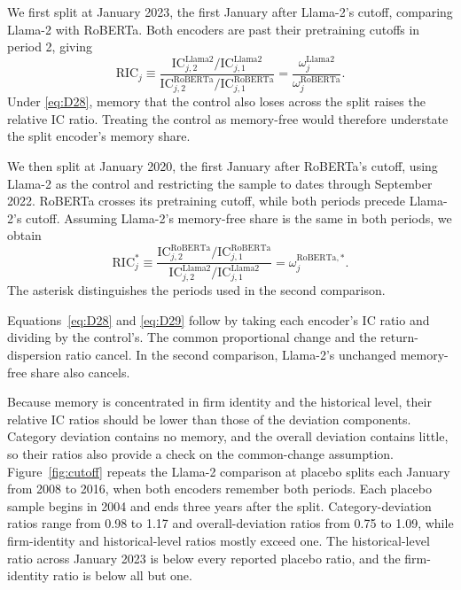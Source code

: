 \documentclass[11pt,letterpaper]{article}
\theoremstyle{remark}
\begin{document}
We first split at January 2023, the first January after Llama-2's cutoff, comparing Llama-2 with RoBERTa. Both encoders are past their pretraining cutoffs in period 2, giving
\begin{equation}\label{eq:D28}
\mathrm{RIC}_j
\equiv
\frac{\mathrm{IC}_{j,2}^{\mathrm{Llama2}}/\mathrm{IC}_{j,1}^{\mathrm{Llama2}}}
{\mathrm{IC}_{j,2}^{\mathrm{RoBERTa}}/\mathrm{IC}_{j,1}^{\mathrm{RoBERTa}}}
=
\frac{\omega_j^{\mathrm{Llama2}}}{\omega_j^{\mathrm{RoBERTa}}}.
\end{equation}
Under \eqref{eq:D28}, memory that the control also loses across the split raises the relative IC ratio. Treating the control as memory-free would therefore understate the split encoder's memory share.

We then split at January 2020, the first January after RoBERTa's cutoff, using Llama-2 as the control and restricting the sample to dates through September 2022. RoBERTa crosses its pretraining cutoff, while both periods precede Llama-2's cutoff. Assuming Llama-2's memory-free share is the same in both periods, we obtain
\begin{equation}\label{eq:D29}
\mathrm{RIC}_j^*
\equiv
\frac{\mathrm{IC}_{j,2}^{\mathrm{RoBERTa}}/\mathrm{IC}_{j,1}^{\mathrm{RoBERTa}}}
{\mathrm{IC}_{j,2}^{\mathrm{Llama2}}/\mathrm{IC}_{j,1}^{\mathrm{Llama2}}}
=\omega_j^{\mathrm{RoBERTa},*}.
\end{equation}
The asterisk distinguishes the periods used in the second comparison.

Equations~\eqref{eq:D28} and \eqref{eq:D29} follow by taking each encoder's IC ratio and dividing by the control's. The common proportional change and the return-dispersion ratio cancel. In the second comparison, Llama-2's unchanged memory-free share also cancels.

Because memory is concentrated in firm identity and the historical level, their relative IC ratios should be lower than those of the deviation components. Category deviation contains no memory, and the overall deviation contains little, so their ratios also provide a check on the common-change assumption. Figure~\ref{fig:cutoff} repeats the Llama-2 comparison at placebo splits each January from 2008 to 2016, when both encoders remember both periods. Each placebo sample begins in 2004 and ends three years after the split. Category-deviation ratios range from 0.98 to 1.17 and overall-deviation ratios from 0.75 to 1.09, while firm-identity and historical-level ratios mostly exceed one. The historical-level ratio across January 2023 is below every reported placebo ratio, and the firm-identity ratio is below all but one.
\end{document}
